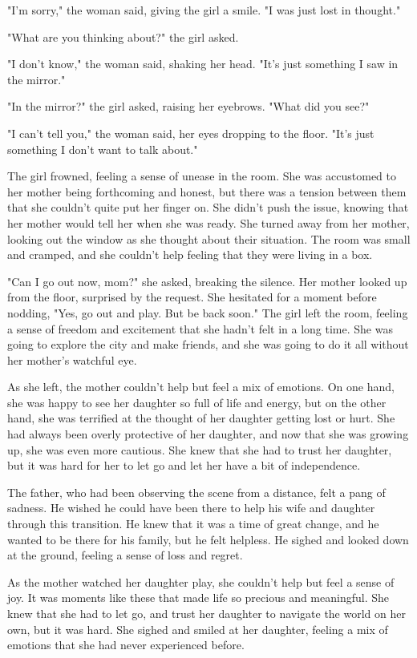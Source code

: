 \documentclass[smalldemyvopaper,11pt,twoside,onecolumn,openright,extrafontsizes]{memoir}
\newlength\drop
\begin{document}
"I'm sorry," the woman said, giving the girl a smile. "I was just lost in thought."\par
"What are you thinking about?" the girl asked.\par
"I don't know," the woman said, shaking her head. "It's just something I saw in the mirror."\par
"In the mirror?" the girl asked, raising her eyebrows. "What did you see?"\par
"I can't tell you," the woman said, her eyes dropping to the floor. "It's just something I don't want to talk about."\par
The girl frowned, feeling a sense of unease in the room. She was accustomed to her mother being forthcoming and honest, but there was a tension between them that she couldn't quite put her finger on. She didn't push the issue, knowing that her mother would tell her when she was ready. She turned away from her mother, looking out the window as she thought about their situation. The room was small and cramped, and she couldn't help feeling that they were living in a box.\par
"Can I go out now, mom?" she asked, breaking the silence. Her mother looked up from the floor, surprised by the request. She hesitated for a moment before nodding, "Yes, go out and play. But be back soon." The girl left the room, feeling a sense of freedom and excitement that she hadn't felt in a long time. She was going to explore the city and make friends, and she was going to do it all without her mother's watchful eye.\par
As she left, the mother couldn't help but feel a mix of emotions. On one hand, she was happy to see her daughter so full of life and energy, but on the other hand, she was terrified at the thought of her daughter getting lost or hurt. She had always been overly protective of her daughter, and now that she was growing up, she was even more cautious. She knew that she had to trust her daughter, but it was hard for her to let go and let her have a bit of independence.\par
The father, who had been observing the scene from a distance, felt a pang of sadness. He wished he could have been there to help his wife and daughter through this transition. He knew that it was a time of great change, and he wanted to be there for his family, but he felt helpless. He sighed and looked down at the ground, feeling a sense of loss and regret.\par
As the mother watched her daughter play, she couldn't help but feel a sense of joy. It was moments like these that made life so precious and meaningful. She knew that she had to let go, and trust her daughter to navigate the world on her own, but it was hard. She sighed and smiled at her daughter, feeling a mix of emotions that she had never experienced before.\par
\end{document}
